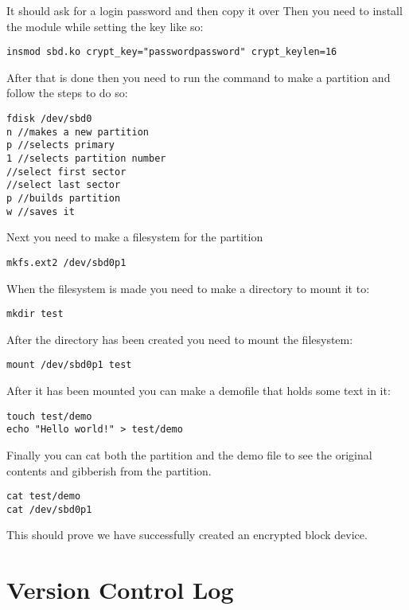 \documentclass[10pt,letterpaper,onecolumn,draftclsnofoot]{IEEEtran}
\begin{document}
It should ask for a login password and then copy it over
Then you need to install the module while setting the key like so:

\begin{lstlisting}
insmod sbd.ko crypt_key="passwordpassword" crypt_keylen=16
\end{lstlisting}

After that is done then you need to run the command to make a partition and follow the steps to do so:

\begin{lstlisting}
fdisk /dev/sbd0
n //makes a new partition
p //selects primary
1 //selects partition number
//select first sector
//select last sector
p //builds partition
w //saves it
\end{lstlisting}

Next you need to make a filesystem for the partition

\begin{lstlisting}
mkfs.ext2 /dev/sbd0p1
\end{lstlisting}

When the filesystem is made you need to make a directory to mount it to:

\begin{lstlisting}
mkdir test
\end{lstlisting}

After the directory has been created you need to mount the filesystem:

\begin{lstlisting}
mount /dev/sbd0p1 test
\end{lstlisting}

After it has been mounted you can make a demofile that holds some text in it:

\begin{lstlisting}
touch test/demo
echo "Hello world!" > test/demo
\end{lstlisting}

Finally you can cat both the partition and the demo file to see the original contents and gibberish from the partition.

\begin{lstlisting}
cat test/demo
cat /dev/sbd0p1
\end{lstlisting}

This should prove we have successfully created an encrypted block device.

\section{Version Control Log}
\end{document}
